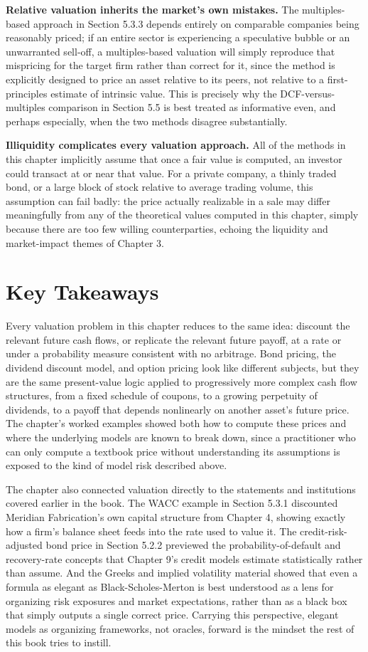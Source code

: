 \documentclass[../ai_in_finance]{subfiles}
\begin{document}
\textbf{Relative valuation inherits the market's own mistakes.} The multiples-based approach in Section 5.3.3 depends entirely on comparable companies being reasonably priced; if an entire sector is experiencing a speculative bubble or an unwarranted sell-off, a multiples-based valuation will simply reproduce that mispricing for the target firm rather than correct for it, since the method is explicitly designed to price an asset relative to its peers, not relative to a first-principles estimate of intrinsic value. This is precisely why the DCF-versus-multiples comparison in Section 5.5 is best treated as informative even, and perhaps especially, when the two methods disagree substantially.

\textbf{Illiquidity complicates every valuation approach.} All of the methods in this chapter implicitly assume that once a fair value is computed, an investor could transact at or near that value. For a private company, a thinly traded bond, or a large block of stock relative to average trading volume, this assumption can fail badly: the price actually realizable in a sale may differ meaningfully from any of the theoretical values computed in this chapter, simply because there are too few willing counterparties, echoing the liquidity and market-impact themes of Chapter 3.

\section{Key Takeaways}

Every valuation problem in this chapter reduces to the same idea: discount the relevant future cash flows, or replicate the relevant future payoff, at a rate or under a probability measure consistent with no arbitrage. Bond pricing, the dividend discount model, and option pricing look like different subjects, but they are the same present-value logic applied to progressively more complex cash flow structures, from a fixed schedule of coupons, to a growing perpetuity of dividends, to a payoff that depends nonlinearly on another asset's future price. The chapter's worked examples showed both how to compute these prices and where the underlying models are known to break down, since a practitioner who can only compute a textbook price without understanding its assumptions is exposed to the kind of model risk described above.

The chapter also connected valuation directly to the statements and institutions covered earlier in the book. The WACC example in Section 5.3.1 discounted Meridian Fabrication's own capital structure from Chapter 4, showing exactly how a firm's balance sheet feeds into the rate used to value it. The credit-risk-adjusted bond price in Section 5.2.2 previewed the probability-of-default and recovery-rate concepts that Chapter 9's credit models estimate statistically rather than assume. And the Greeks and implied volatility material showed that even a formula as elegant as Black-Scholes-Merton is best understood as a lens for organizing risk exposures and market expectations, rather than as a black box that simply outputs a single correct price. Carrying this perspective, elegant models as organizing frameworks, not oracles, forward is the mindset the rest of this book tries to instill.
\end{document}

